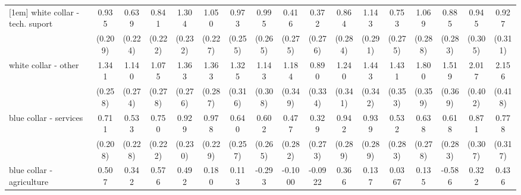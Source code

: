 {\begin{tabular}{l*{16}{c}}
[1em]
white collar - tech. suport&       0.935\sym{***}&       0.639\sym{**} &       0.841\sym{***}&       1.304\sym{***}&       1.050\sym{***}&       0.973\sym{***}&       0.995\sym{***}&       0.416         &       0.372         &       0.864\sym{**} &       1.143\sym{***}&       0.753\sym{**} &       1.069\sym{***}&       0.885\sym{**} &       0.945\sym{**} &       0.927\sym{**} \\
                    &     (0.209)         &     (0.224)         &     (0.222)         &     (0.232)         &     (0.227)         &     (0.255)         &     (0.265)         &     (0.275)         &     (0.276)         &     (0.284)         &     (0.291)         &     (0.275)         &     (0.288)         &     (0.283)         &     (0.305)         &     (0.311)         \\
[1em]
white collar - other&       1.341\sym{***}&       1.140\sym{***}&       1.075\sym{***}&       1.363\sym{***}&       1.363\sym{***}&       1.325\sym{***}&       1.143\sym{***}&       1.184\sym{***}&       0.890\sym{**} &       1.240\sym{***}&       1.443\sym{***}&       1.431\sym{***}&       1.800\sym{***}&       1.519\sym{***}&       2.017\sym{***}&       2.156\sym{***}\\
                    &     (0.258)         &     (0.274)         &     (0.278)         &     (0.276)         &     (0.287)         &     (0.316)         &     (0.308)         &     (0.349)         &     (0.334)         &     (0.341)         &     (0.342)         &     (0.353)         &     (0.359)         &     (0.369)         &     (0.402)         &     (0.418)         \\
[1em]
blue collar - services&       0.711\sym{***}&       0.533\sym{*}  &       0.750\sym{***}&       0.929\sym{***}&       0.978\sym{***}&       0.640\sym{*}  &       0.602\sym{*}  &       0.477         &       0.329         &       0.942\sym{**} &       0.939\sym{**} &       0.532         &       0.638\sym{*}  &       0.618\sym{*}  &       0.871\sym{**} &       0.778\sym{*}  \\
                    &     (0.208)         &     (0.228)         &     (0.222)         &     (0.230)         &     (0.229)         &     (0.257)         &     (0.265)         &     (0.282)         &     (0.273)         &     (0.289)         &     (0.289)         &     (0.283)         &     (0.278)         &     (0.283)         &     (0.307)         &     (0.317)         \\
[1em]
blue collar - agriculture&       0.507         &       0.342         &       0.576         &       0.492         &       0.180         &       0.113         &      -0.293         &     -0.1000         &     -0.0922         &       0.366         &       0.137         &      0.0367         &       0.135         &      -0.586         &       0.322         &       0.436         \\

\end{tabular}}
